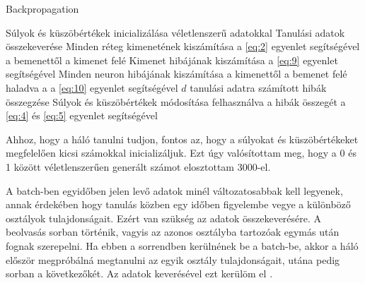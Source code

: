  
\begin{algorithm}
\caption{Backpropagation}
\label{pseudoPSO}
\begin{algorithmic}[1]
\State Súlyok és küszöbértékek inicializálása véletlenszerű adatokkal
    \State Tanulási adatok összekeverése
		    \State Minden réteg kimenetének kiszámítása a \ref{eq:2} egyenlet segítségével a bemenettől a kimenet felé
		    \State Kimenet hibájának kiszámítása a \ref{eq:9} egyenlet segítségével
		    \State Minden neuron hibájának kiszámítása a kimenettől a bemenet felé haladva a a \ref{eq:10} egyenlet segítségével
		\EndFor
		\State $d$ tanulási adatra számított hibák összegzése 
		\State Súlyok és küszöbértékek módosítása felhasználva a hibák összegét a \ref{eq:4} és \ref{eq:5} egyenlet segítségével
    \EndFor
\EndFor
\end{algorithmic}
\end{algorithm}

 Ahhoz, hogy a háló tanulni tudjon, fontos az, hogy a súlyokat és küszöbértékeket megfelelően kicsi számokkal inicializáljuk. Ezt úgy valósítottam meg, hogy a 0 és 1 között véletlenszerűen generált számot elosztottam 3000-el.
 
 A batch-ben egyidőben jelen levő adatok minél változatosabbak kell legyenek, annak érdekében hogy tanulás közben egy időben figyelembe vegye a különböző osztályok tulajdonságait. Ezért van szükség az adatok összekeverésére. A beolvasás sorban történik, vagyis az azonos osztályba tartozóak egymás után fognak szerepelni. Ha ebben a sorrendben kerülnének be a batch-be, akkor a háló először megpróbálná megtanulni az egyik osztály tulajdonságait, utána pedig sorban a következőkét. Az adatok keverésével ezt kerülöm el \cite{5}.